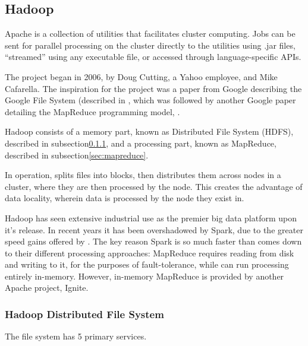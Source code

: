 \hypertarget{sec:hadoop-1}{%
    \subsection{Hadoop}\label{sec:hadoop-1}}

Apache  is a collection of utilities that facilitates cluster
computing. Jobs can be sent for parallel processing on the cluster
directly to the utilities using .jar files, ``streamed'' using any
executable file, or accessed through language-specific APIs.

The project began in 2006, by Doug Cutting, a Yahoo employee, and Mike
Cafarella. The inspiration for the project was a paper from Google
describing the Google File System (described in
\cite{ghemawat2003google}, which was followed by another Google paper
detailing the MapReduce programming model, \cite{dean2004mapreduce}.

Hadoop consists of a memory part, known as  Distributed File
System (HDFS), described in subsection\cref{sec:hdfs},
and a processing part, known as MapReduce, described in
subsection\cref{sec:mapreduce}.

In operation,  splits files into blocks, then distributes them
across nodes in a cluster, where they are then processed by the node.
This creates the advantage of data locality, wherein data is processed
by the node they exist in.

Hadoop has seen extensive industrial use as the premier big data
platform upon it's release. In recent years it has been overshadowed by
Spark, due to the greater speed gains offered by . The key reason
Spark is so much faster than  comes down to their different
processing approaches:  MapReduce requires reading from disk and
writing to it, for the purposes of fault-tolerance, while  can run
processing entirely in-memory. However, in-memory MapReduce is provided
by another Apache project, Ignite\cite{zheludkov2017high}.

\hypertarget{sec:hdfs}{%
    \subsubsection{Hadoop Distributed File System}\label{sec:hdfs}}

The file system has 5 primary services.

